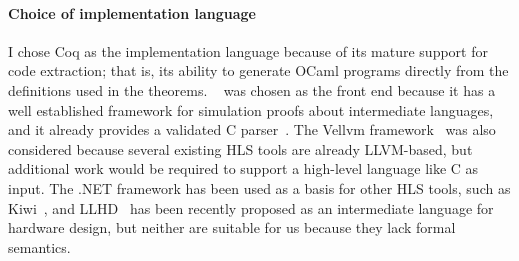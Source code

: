 

\paragraph{Choice of implementation language}

I chose Coq as the implementation language because of its mature support for
code extraction; that is, its ability to generate OCaml programs directly from
the definitions used in the theorems.
\compcert{}~\cite{leroy09_formal_verif_realis_compil} was chosen as the front
end because it has a well established framework for simulation proofs about
intermediate languages, and it already provides a validated C
parser~\cite{jourdan12_valid_lr_parser}.  The Vellvm
framework~\cite{zhao12_formal_llvm_inter_repres_verif_progr_trans} was also
considered because several existing HLS tools are already LLVM-based, but
additional work would be required to support a high-level language like C as
input.  The .NET framework has been used as a basis for other HLS tools, such as
Kiwi~\cite{greaves08_kiwi}, and LLHD~\cite{schuiki20_llhd} has been recently
proposed as an intermediate language for hardware design, but neither are
suitable for us because they lack formal semantics.

